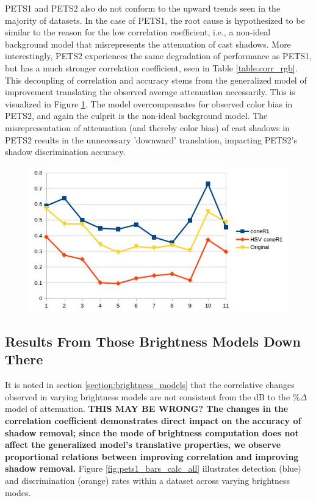 \documentclass[12pt]{report}
\begin{document}
PETS1 and PETS2 also do not conform to the upward trends seen in the majority of datasets. In the case of PETS1, the root cause is hypothesized to be similar to the reason for the low correlation coefficient, i.e., a non-ideal background model that misrepresents the attenuation of cast shadows. More interestingly, PETS2 experiences the same degradation of performance as PETS1, but has a much stronger correlation coefficient, seen in Table \ref{table:corr_rgb}. This decoupling of correlation and accuracy stems from the generalized model of improvement translating the observed average attenuation necessarily. This is visualized in Figure \ref{fig:pets2_translate}. The model overcompensates for observed color bias in PETS2, and again the culprit is the non-ideal background model. The misrepresentation of attenuation (and thereby color bias) of cast shadows in PETS2 results in the unnecessary 'downward' translation, impacting PETS2's shadow discrimination accuracy.

\begin{figure}
  \centering
  \includegraphics[width=1\linewidth]{figures/model/pets2_translate.jpg}
\caption{}
\label{fig:pets2_translate}
\end{figure} 

\subsection{Results From Those Brightness Models Down There}

It is noted in section \ref{section:brightness_models} that the correlative changes observed in varying brightness models are not consistent from the dB to the \%$\Delta$ model of attenuation. \textbf{THIS MAY BE WRONG? The changes in the correlation coefficient demonstrates direct impact on the accuracy of shadow removal; since the mode of brightness computation does not affect the generalized model's translative properties, we observe proportional relations between improving correlation and improving shadow removal.} Figure \ref{fig:pets1_bars_calc_all} illustrates detection (blue) and discrimination (orange) rates within a dataset across varying brightness modes.
\end{document}
